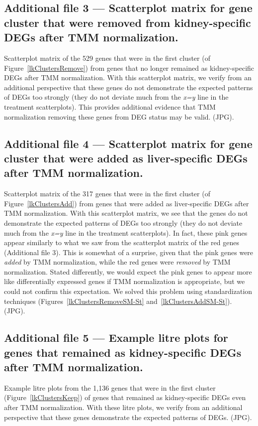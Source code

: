 \documentclass{bmcart}
\begin{document}
\begin{linenumbers}
\begin{backmatter}
  \subsection*{Additional file 3 --- Scatterplot matrix for gene cluster that were removed from kidney-specific DEGs after TMM normalization.}
    Scatterplot matrix of the 529 genes that were in the first cluster (of Figure~\ref{lkClustersRemove}) from genes that no longer remained as kidney-specific DEGs after TMM normalization. With this scatterplot matrix, we verify from an additional perspective that these genes do not demonstrate the expected patterns of DEGs too strongly (they do not deviate much from the \textit{x=y} line in the treatment scatterplots). This provides additional evidence that TMM normalization removing these genes from DEG status may be valid. (JPG).

  \subsection*{Additional file 4 --- Scatterplot matrix for gene cluster that were added as liver-specific DEGs after TMM normalization.}
    Scatterplot matrix of the 317 genes that were in the first cluster (of Figure~\ref{lkClustersAdd}) from genes that were added as liver-specific DEGs after TMM normalization. With this scatterplot matrix, we see that the genes do not demonstrate the expected patterns of DEGs too strongly (they do not deviate much from the \textit{x=y} line in the treatment scatterplots). In fact, these pink genes appear similarly to what we saw from the scatterplot matrix of the red genes (Additional file 3). This is somewhat of a surprise, given that the pink genes were \textit{added} by TMM normalization, while the red genes were \textit{removed} by TMM normalization. Stated differently, we would expect the pink genes to appear more like differentially expressed genes if TMM normalization is appropriate, but we could not confirm this expectation. We solved this problem using standardization techniques (Figures~\ref{lkClustersRemoveSM-St} and~\ref{lkClustersAddSM-St}). (JPG).
    
  \subsection*{Additional file 5 --- Example litre plots for genes that remained as kidney-specific DEGs after TMM normalization.}
    Example litre plots from the 1,136 genes that were in the first cluster (Figure~\ref{lkClustersKeep}) of genes that remained as kidney-specific DEGs even after TMM normalization. With these litre plots, we verify from an additional perspective that these genes demonstrate the expected patterns of DEGs. (JPG). 
    

\end{backmatter}
\end{linenumbers}
\end{document}
